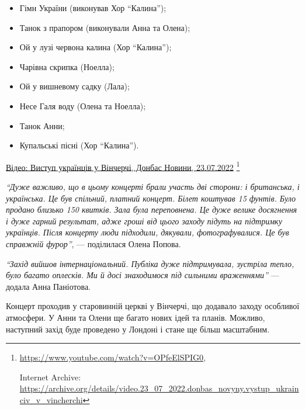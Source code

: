 \begin{itemize} %
\item Гімн України (виконував Хор \enquote{Калина});

\item Танок з прапором (виконували Анна та Олена);

\item Ой у лузі червона калина (Хор \enquote{Калина});

\item Чарівна скрипка (Ноелла);

\item Ой у вишневому садку (Лала);

\item Несе Галя воду (Олена та Ноелла);

\item Танок Анни;

\item Купальські пісні (Хор \enquote{Калина}).
\end{itemize} %

\href{https://archive.org/details/video.23_07_2022.donbas_novyny.vystup_ukrainciv_v_vincherchi}{%
Відео: Виступ українців у Вінчерчі, Донбас Новини, 23.07.2022}%
\footnote{%
\url{https://www.youtube.com/watch?v=OPfeElSPIG0}, \par%
Internet Archive: \url{https://archive.org/details/video.23_07_2022.donbas_novyny.vystup_ukrainciv_v_vincherchi}%
}

\begin{leftbar}
\emph{\enquote{Дуже важливо, що в цьому концерті брали участь дві сторони: і британська, і
українська. Це був спільний, платний концерт. Білет коштував 15 фунтів. Було
продано близько 150 квитків. Зала була переповнена. Це дуже велике досягнення і
дуже гарний результат, адже гроші від цього заходу підуть на підтримку
українців. Після концерту люди підходили, дякували, фотографувалися. Це був
справжній фурор}}, — поділилася Олена Попова.
\end{leftbar}

\begin{leftbar}
\emph{\enquote{Захід вийшов інтернаціональний. Публіка дуже підтримувала, зустріла тепло,
було багато оплесків. Ми й досі знаходимося під сильними враженнями}} — додала
Анна Паніотова.
\end{leftbar}

Концерт проходив у старовинній церкві у Вінчерчі, що додавало заходу особливої
атмосфери. У Анни та Олени ще багато нових ідей та планів. Можливо, наступний
захід буде проведено у Лондоні і стане ще більш масштабним.

